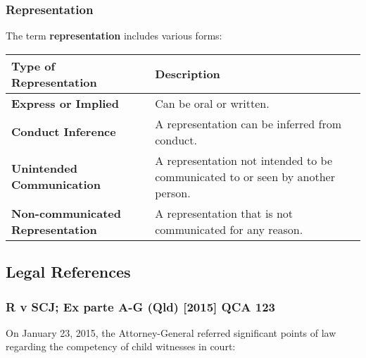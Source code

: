 \subsubsection{Representation}\label{representation}

The term \textbf{representation} includes various forms:

\begin{longtable}[]{@{}
  >{\raggedright\arraybackslash}p{}
  >{\raggedright\arraybackslash}p{}@{}}
\toprule\noalign{}
\begin{minipage}[b]{\linewidth}\raggedright
Type of Representation
\end{minipage} & \begin{minipage}[b]{\linewidth}\raggedright
Description
\end{minipage} \\
\midrule\noalign{}
\endhead
\bottomrule\noalign{}
\endlastfoot
\textbf{Express or Implied} & Can be oral or written. \\
\textbf{Conduct Inference} & A representation can be inferred from
conduct. \\
\textbf{Unintended Communication} & A representation not intended to be
communicated to or seen by another person. \\
\textbf{Non-communicated Representation} & A representation that is not
communicated for any reason. \\
\end{longtable}

\subsection{  Legal References}\label{legal-references-2}

\subsubsection{R v SCJ; Ex parte A-G (Qld) {[}2015{]} QCA
123}\label{r-v-scj-ex-parte-a-g-qld-2015-qca-123}

On January 23, 2015, the Attorney-General referred significant points of
law regarding the competency of child witnesses in court:

